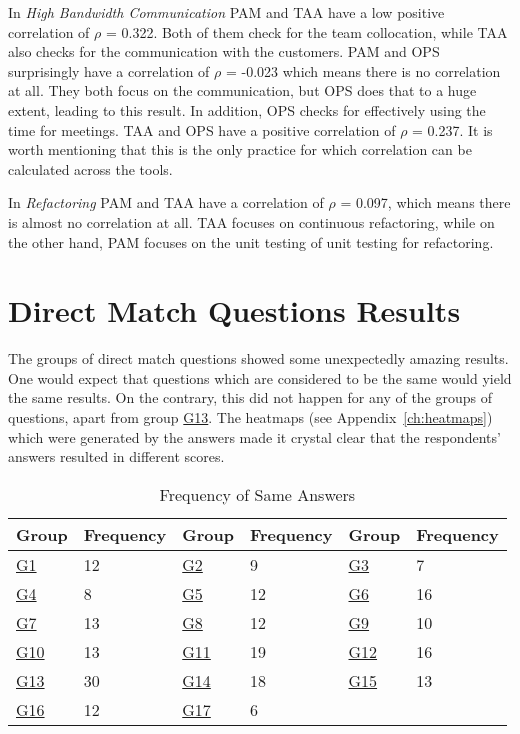 In \textit{High Bandwidth Communication} \ac{PAM} and \ac{TAA} have a low positive correlation of $\rho$ = 0.322. Both of them check for the team collocation, while \ac{TAA} also checks for the communication with the customers. \ac{PAM} and \ac{OPS} surprisingly have a correlation of $\rho$ = -0.023 which means there is no correlation at all. They both focus on the communication, but \ac{OPS} does that to a huge extent, leading to this result. In addition, \ac{OPS} checks for effectively using the time for meetings. \ac{TAA} and \ac{OPS} have a positive correlation of $\rho$ = 0.237. It is worth mentioning that this is the only practice for which correlation can be calculated across the tools.

In \textit{Refactoring} \ac{PAM} and \ac{TAA} have a correlation of $\rho$ = 0.097, which means there is almost no correlation at all. \ac{TAA} focuses on continuous refactoring, while on the other hand, \ac{PAM} focuses on the unit testing of unit testing for refactoring.

\section{Direct Match Questions Results}
\label{sec:direct_match_results}

The groups of direct match questions showed some unexpectedly amazing results. One would expect that questions which are considered to be the same would yield the same results. On the contrary, this did not happen for any of the groups of questions, apart from group \hyperref[G13]{G13}. The heatmaps (see Appendix~\ref{ch:heatmaps}) which were generated by the answers made it crystal clear that the respondents' answers resulted in different scores. 

\begin{table} [H]
	\begin{tabular}{| p{1cm} | p{2cm} | p{1cm} | p{2cm} | p{1cm} | p{2cm} |} \hline
		Group & Frequency & Group & Frequency & Group & Frequency \\ \hline
		\hyperref[G1]{G1} & 12 & \hyperref[G2]{G2} & 9 & \hyperref[G3]{G3} & 7 \\ \hline
		\hyperref[G4]{G4} & 8 & \hyperref[G5]{G5} & 12 & \hyperref[G6]{G6} & 16 \\ \hline
		\hyperref[G7]{G7} & 13 & \hyperref[G8]{G8} & 12 & \hyperref[G9]{G9} & 10 \\ \hline
		\hyperref[G10]{G10} & 13 & \hyperref[G11]{G11} & 19 & \hyperref[G12]{G12} & 16 \\ \hline
		\hyperref[G13]{G13} & 30 & \hyperref[G14]{G14} & 18 & \hyperref[G15]{G15} & 13 \\ \hline
		\hyperref[G16]{G16} & 12 & \hyperref[G17]{G17} & 6 & & \\ \hline
	\end{tabular}
	\caption{Frequency of Same Answers}
	\label{table:answers_frequency}
\end{table}

